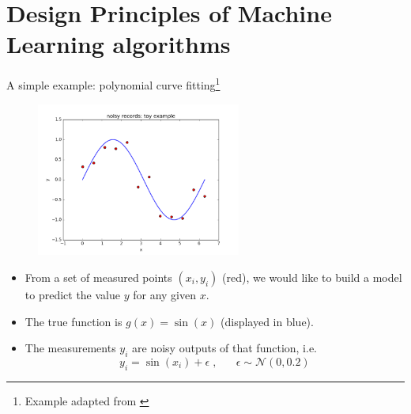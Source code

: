 \documentclass[xcolor=pdftex,dvipsnames,table]{beamer}
\begin{document}
\section{Design Principles of Machine Learning algorithms}

\begin{frame}{A simple example: polynomial curve fitting\footnote{Example adapted from \cite{Bishop2006}}}
\begin{figure}[htb]
\includegraphics[width=0.6\textwidth]{../graphics/sample_from_sin.png}
\end{figure}
\begin{itemize}
	\item From a set of measured points $(x_i, y_i)$ (red), we would like to build a model to predict the value $y$ for any given $x$. 
	\item The true function is $g(x)=\sin (x)$ (displayed in blue).
	\item The measurements $y_i$ are noisy outputs of that function, i.e. 
	\begin{equation}
	y_i = \sin (x_i) + \epsilon \; , \;\;\; \;\;\; \epsilon \sim \mathcal{N}(0,0.2)
	\end{equation}
\end{itemize}
\end{frame}
\end{document}
